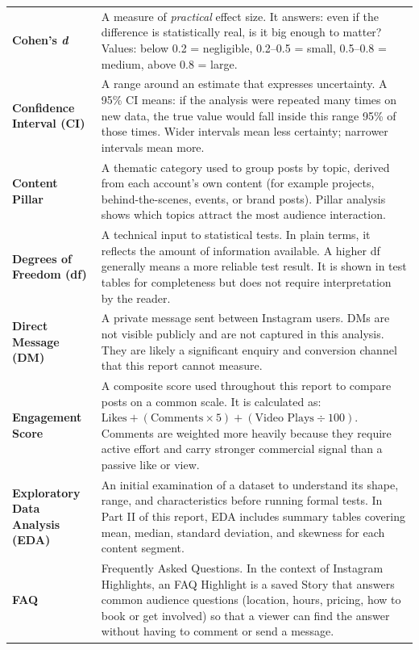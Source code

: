 \begin{longtable}{@{}L{4cm} L{11.5cm}@{}}
\textbf{Cohen's \textit{d}} &
A measure of \textit{practical} effect size. It answers: even if the difference is
statistically real, is it big enough to matter? Values: below 0.2 = negligible,
0.2--0.5 = small, 0.5--0.8 = medium, above 0.8 = large. \\[4pt]

\textbf{Confidence Interval (CI)} &
A range around an estimate that expresses uncertainty. A 95\% CI means: if the
analysis were repeated many times on new data, the true value would fall inside
this range 95\% of those times. Wider intervals mean less certainty; narrower
intervals mean more. \\[4pt]

\textbf{Content Pillar} &
A thematic category used to group posts by topic, derived from each account's own
content (for example projects, behind-the-scenes, events, or brand posts). Pillar
analysis shows which topics attract the most audience interaction. \\[4pt]

\textbf{Degrees of Freedom (df)} &
A technical input to statistical tests. In plain terms, it reflects the amount
of information available. A higher df generally means a more reliable test result.
It is shown in test tables for completeness but does not require interpretation
by the reader. \\[4pt]

\textbf{Direct Message (DM)} &
A private message sent between Instagram users. DMs are not visible publicly and
are not captured in this analysis. They are likely a significant enquiry and
conversion channel that this report cannot measure. \\[4pt]

\textbf{Engagement Score} &
A composite score used throughout this report to compare posts on a common scale.
It is calculated as: $\text{Likes} + (\text{Comments} \times 5) + (\text{Video Plays} \div 100)$.
Comments are weighted more heavily because they require active effort and carry
stronger commercial signal than a passive like or view. \\[4pt]

\textbf{Exploratory Data Analysis (EDA)} &
An initial examination of a dataset to understand its shape, range, and
characteristics before running formal tests. In Part II of this report, EDA
includes summary tables covering mean, median, standard deviation, and skewness
for each content segment. \\[4pt]

\textbf{FAQ} &
Frequently Asked Questions. In the context of Instagram Highlights, an FAQ
Highlight is a saved Story that answers common audience questions (location,
hours, pricing, how to book or get involved) so that a viewer can find the answer
without having to comment or send a message. \\[4pt]


\end{longtable}
